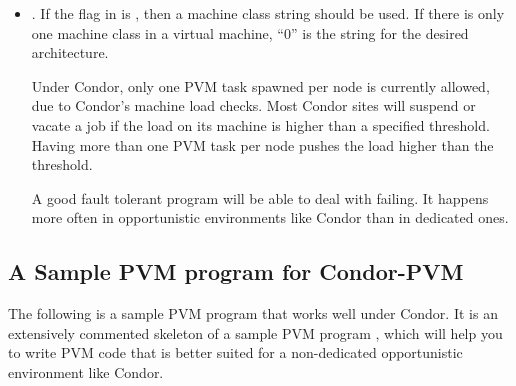 \begin{itemize}
\item {}.  If  the flag in  is 
  , then a machine class string 
  should be used.  If there is only one machine class
  in a virtual machine, ``0'' is the string for the desired architecture.

  Under Condor, only one
  PVM task spawned per node is currently allowed,
  due to Condor's machine load checks.
  Most Condor 
  sites will suspend or vacate
  a job if the load on its machine is higher than a specified
  threshold.
  Having more than one PVM task per node pushes the load
  higher than the threshold.

  A good fault tolerant program will be able to deal with
   failing.  It happens more often in opportunistic 
  environments like Condor than in dedicated ones.

\end{itemize}

\subsection{A Sample PVM program for Condor-PVM}

The following is a sample PVM program that works well under Condor.
It is an extensively commented skeleton of a sample PVM
program , which will help you to
write PVM code that is better suited for a non-dedicated opportunistic
environment like Condor.

